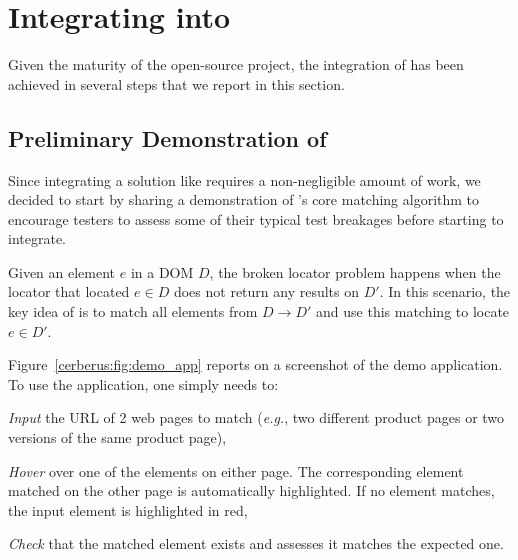 \section{Integrating \erratum into \cerberus}\label{cerberus:sec:integration}
Given the maturity of the \cerberus open-source project, the integration of \erratum{} has been achieved in several steps that we report in this section.

\subsection{Preliminary Demonstration of \erratum}\label{cerberus:sec:demo}
Since integrating a solution like \erratum requires a non-negligible amount of work, we decided to start by sharing a demonstration of \erratum's core matching algorithm to encourage testers to assess some of their typical test breakages before starting to integrate.

Given an element $e$ in a DOM $D$, the broken locator problem happens when the locator that located $e \in D$ does not return any results on $D'$.
In this scenario, the key idea of \erratum is to match all elements from $D \to D'$ and use this matching to locate $e \in D'$.

Figure~\ref{cerberus:fig:demo_app} reports on a screenshot of the demo application.
To use the application, one simply needs to:
\begin{compactenum}[\em i)]
    \item \emph{Input} the URL of 2 web pages to match (\emph{e.g.}, two different product pages or two versions of the same product page),
    \item \emph{Hover} over one of the elements on either page. The corresponding element matched on the other page is automatically highlighted. If no element matches, the input element is highlighted in red,
    \item \emph{Check} that the matched element exists and assesses it matches the expected one.
\end{compactenum}

